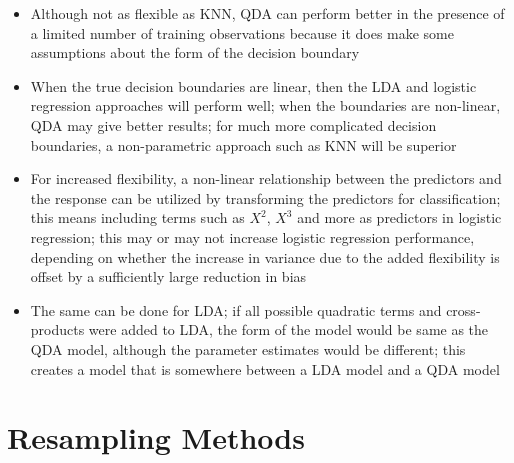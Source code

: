 \documentclass[12pt]{article}
\begin{document}
\begin{itemize}
\item Although not as flexible as KNN, QDA can perform better in the presence of a limited number of training observations because it does make some assumptions about the form of the decision boundary 
\item When the true decision boundaries are linear, then the LDA and logistic regression approaches will perform well; when the boundaries are non-linear, QDA may give better results; for much more complicated decision boundaries, a non-parametric approach such as KNN will be superior 
\item For increased flexibility, a non-linear relationship between the predictors and the response can be utilized by transforming the predictors for classification; this means including terms such as $X^2$, $X^3$ and more as predictors in logistic regression; this may or may not increase logistic regression performance, depending on whether the increase in variance due to the added flexibility is offset by a sufficiently large reduction in bias
\item The same can be done for LDA; if all possible quadratic terms and cross-products were added to LDA, the form of the model would be same as the QDA model, although the parameter estimates would be different; this creates a model that is somewhere between a LDA model and a QDA model
\end{itemize}\newpage

\section{Resampling Methods}
\end{document}

